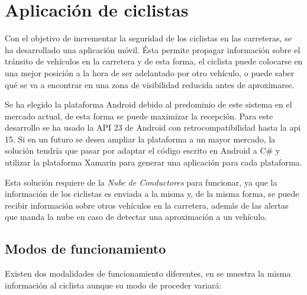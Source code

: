 \section{Aplicación de ciclistas}\label{section:appCiclistas}
Con el objetivo de incrementar la seguridad de los ciclistas en las carreteras, se
ha desarrollado una aplicación móvil. Ésta permite propagar información sobre el
tránsito de vehículos en la carretera y de esta forma, el ciclista puede colocarse
en una mejor posición a la hora de ser adelantado por otro vehículo,
o puede saber qué se va a encontrar en una zona de visibilidad reducida antes de
aproximarse.

Se ha elegido la plataforma Android debido al predominio de este sistema en el mercado
actual, de esta forma se puede maximizar la recepción. Para este desarrollo se ha
usado la API 23 de Android con retrocompatibilidad hasta la \gls{api} 15. Si en
un futuro se desea ampliar la plataforma a un mayor mercado, la solución tendría
que pasar por adaptar el código escrito en Android a C\# y utilizar la plataforma
Xamarin para generar una aplicación para cada plataforma.

Esta solución requiere de la \emph{Nube de Conductores} para funcionar, ya que la
información de los ciclistas es enviada a la misma y, de la misma forma, se puede
recibir información sobre otros vehículos en la carretera, además de las alertas
que manda la nube en caso de detectar una aproximación a un vehículo.

\subsection{Modos de funcionamiento}\label{ssection:commHUB}
Existen dos modalidades de funcionamiento diferentes, en se muestra la misma
información al ciclista aunque su modo de proceder variará:

